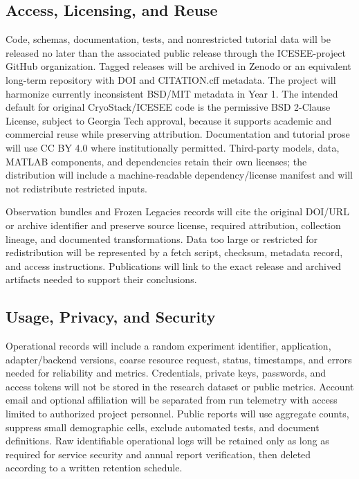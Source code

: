 \subsection*{Access, Licensing, and Reuse}

Code, schemas, documentation, tests, and nonrestricted tutorial data will be
released no later than the associated public release through the
ICESEE-project GitHub organization. Tagged releases will be archived in Zenodo
or an equivalent long-term repository with DOI and CITATION.cff metadata. The
project will harmonize currently inconsistent BSD/MIT metadata in Year 1. The
intended default for original CryoStack/ICESEE code is the permissive BSD
2-Clause License, subject to Georgia Tech approval, because it supports
academic and commercial reuse while preserving attribution. Documentation and
tutorial prose will use CC BY 4.0 where institutionally permitted. Third-party
models, data, MATLAB components, and dependencies retain their own licenses;
the distribution will include a machine-readable dependency/license manifest
and will not redistribute restricted inputs.

Observation bundles and Frozen Legacies records will cite the original DOI/URL
or archive identifier and preserve source license, required attribution,
collection lineage, and documented transformations. Data too large or restricted for redistribution will
be represented by a fetch script, checksum, metadata record, and access
instructions. Publications will link to the exact release and archived
artifacts needed to support their conclusions.

\subsection*{Usage, Privacy, and Security}

Operational records will include a random experiment identifier, application,
adapter/backend versions, coarse resource request, status, timestamps, and
errors needed for reliability and metrics. Credentials, private keys,
passwords, and access tokens will not be stored in the research dataset or
public metrics. Account email and optional affiliation will be separated from
run telemetry with access limited to authorized project personnel. Public
reports will use aggregate counts, suppress small demographic cells, exclude
automated tests, and document definitions. Raw identifiable operational logs
will be retained only as long as required for service security and annual
report verification, then deleted according to a written retention schedule.

